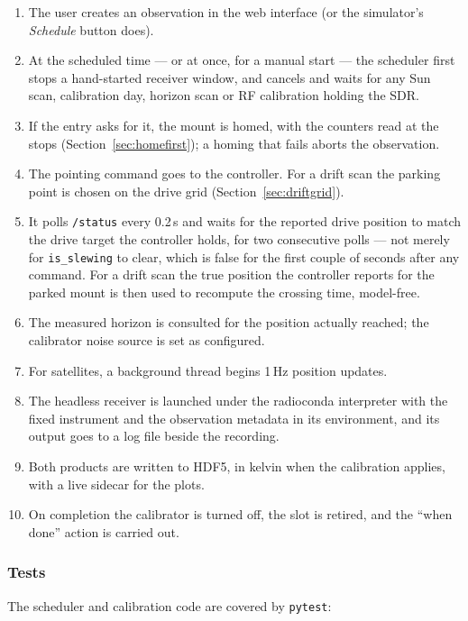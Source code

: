 \documentclass[11pt,a4paper]{article}
\begin{document}
\begin{enumerate}
    \item The user creates an observation in the web interface (or the simulator's \emph{Schedule} button does).
    \item At the scheduled time --- or at once, for a manual start --- the scheduler first stops a hand-started receiver window, and cancels and waits for any Sun scan, calibration day, horizon scan or RF calibration holding the SDR.
    \item If the entry asks for it, the mount is homed, with the counters read at the stops (Section~\ref{sec:homefirst}); a homing that fails aborts the observation.
    \item The pointing command goes to the controller. For a drift scan the parking point is chosen on the drive grid (Section~\ref{sec:driftgrid}).
    \item It polls \texttt{/status} every 0.2\,s and waits for the reported drive position to match the drive target the controller holds, for two consecutive polls --- not merely for \texttt{is\_slewing} to clear, which is false for the first couple of seconds after any command. For a drift scan the true position the controller reports for the parked mount is then used to recompute the crossing time, model-free.
    \item The measured horizon is consulted for the position actually reached; the calibrator noise source is set as configured.
    \item For satellites, a background thread begins 1\,Hz position updates.
    \item The headless receiver is launched under the radioconda interpreter with the fixed instrument and the observation metadata in its environment, and its output goes to a log file beside the recording.
    \item Both products are written to HDF5, in kelvin when the calibration applies, with a live sidecar for the plots.
    \item On completion the calibrator is turned off, the slot is retired, and the ``when done'' action is carried out.
\end{enumerate}

\subsubsection{Tests}

The scheduler and calibration code are covered by \texttt{pytest}:
\end{document}
